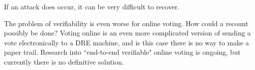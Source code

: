 \documentclass[12pt, titlepage]{article}
\begin{document}
If an attack does occur, it can be very difficult to recover.

The problem of verifiability is even worse for online voting. How could a recount possibly be done? Voting online is an even more complicated version of sending a vote electronically to a DRE machine, and is this case there is no way to make a paper trail. Research into ``end-to-end verifiable" online voting is ongoing, but currently there is no definitive solution.



\newpage
\printbibliography
\end{document}
